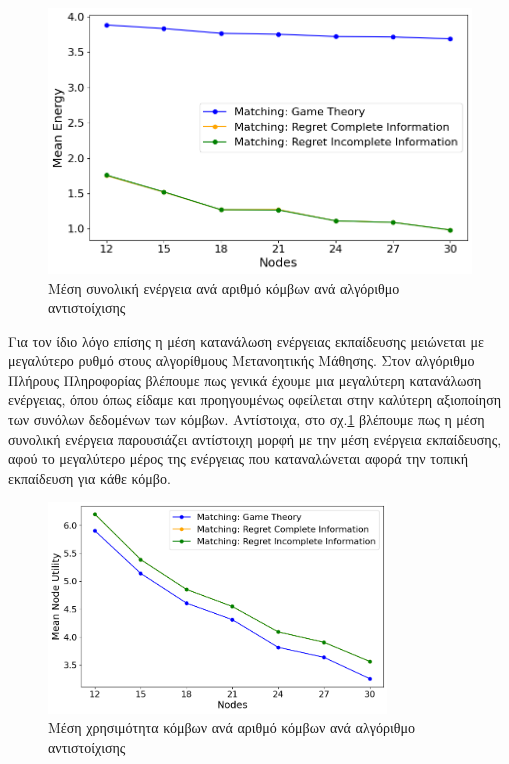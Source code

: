\begin{figure}[H]
    \centering
    \includegraphics[width=\textwidth]{figures/chapter4/Mean_Energy_vs_Users.png}
    \caption{Μέση συνολική ενέργεια ανά αριθμό κόμβων ανά αλγόριθμο αντιστοίχισης}
    \label{fig36}
\end{figure}

\newpage

Για τον ίδιο λόγο επίσης η μέση κατανάλωση ενέργειας εκπαίδευσης μειώνεται με μεγαλύτερο ρυθμό στους αλγορίθμους Μετανοητικής Μάθησης. Στον αλγόριθμο Πλήρους Πληροφορίας βλέπουμε πως γενικά έχουμε μια μεγαλύτερη κατανάλωση ενέργειας, όπου όπως είδαμε και προηγουμένως οφείλεται στην καλύτερη αξιοποίηση των συνόλων δεδομένων των κόμβων. Αντίστοιχα, στο σχ.\ref{fig36} βλέπουμε πως η μέση συνολική ενέργεια παρουσιάζει αντίστοιχη μορφή με την μέση ενέργεια εκπαίδευσης, αφού το μεγαλύτερο μέρος της ενέργειας που καταναλώνεται αφορά την τοπική εκπαίδευση για κάθε κόμβο.

\begin{figure}[H]
    \centering
    \includegraphics[width=0.8\textwidth]{figures/chapter4/Mean_User_Utility_vs_Users.png}
    \caption{Μέση χρησιμότητα κόμβων ανά αριθμό κόμβων ανά αλγόριθμο αντιστοίχισης}
    \label{fig37}
\end{figure}

